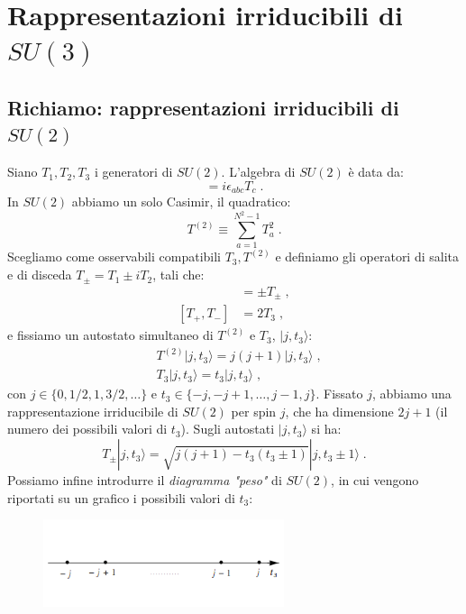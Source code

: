 \documentclass[12pt,a4paper]{article}
\theoremstyle{definition}
\newcommand{\ket}{\rangle}
\numberwithin{equation}{section}
\begin{document}
\section{Rappresentazioni irriducibili di $SU(3)$}
\subsection{Richiamo: rappresentazioni irriducibili di $SU(2)$}
Siano $T_1,T_2,T_3$ i generatori di $SU(2)$. L'algebra di $SU(2)$ è data da:
\begin{equation}
[T_a,T_b]=i\epsilon_{abc}T_c\;.
\end{equation}
In $SU(2)$ abbiamo un solo Casimir, il quadratico:
$$
T^{(2)}\equiv \sum_{a=1}^{N^2-1}T_a^2\;.
$$
Scegliamo come osservabili compatibili $T_3,T^{(2)}$ e definiamo gli operatori di salita e di disceda $T_{\pm}=T_1\pm iT_2$, tali che:
\begin{align*}
[T_3,T_{\pm}]&= \pm T_{\pm}\;, \\
[T_+,T_-]&= 2T_3\;,
\end{align*}
e fissiamo un autostato simultaneo di $T^{(2)}$ e $T_3$, $|j,t_3\ket$:
\begin{align*}
& T^{(2)}|j,t_3\ket=j(j+1)|j,t_3\ket\;, \\
& T_3|j,t_3\ket=t_3|j,t_3\ket\;,
\end{align*}
con $j\in \{0,1/2,1,3/2,\ldots\}$ e $t_3\in \{-j,-j+1,\ldots,j-1,j\}$. Fissato $j$, abbiamo una rappresentazione irriducibile di $SU(2)$ per spin $j$, che ha dimensione $2j+1$ (il numero dei possibili valori di $t_3$). Sugli autostati $|j,t_3\ket$ si ha:
$$
T_{\pm}|j,t_3\ket=\sqrt{j(j+1)-t_3(t_3\pm 1)}|j,t_3\pm 1\ket\;.
$$
Possiamo infine introdurre il \emph{diagramma "peso"} di $SU(2)$, in cui vengono riportati su un grafico i possibili valori di $t_3$:
\begin{figure}[h]
\centering
\includegraphics[width=200pt,keepaspectratio=true]{Addons/pesosu2}
\end{figure}
\pagebreak
\end{document}
